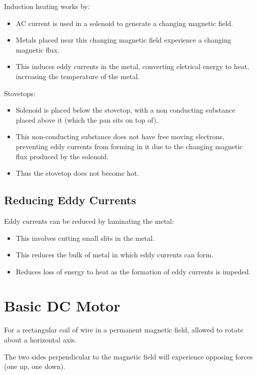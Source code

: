 \documentclass[a4paper,11pt]{report}
\begin{document}
Induction heating works by:

\begin{itemize}
\item AC current is used in a solenoid to generate a changing magnetic field.
\item Metals placed near this changing magnetic field experience a changing
	magnetic flux.
\item This induces eddy currents in the metal, converting eletrical energy to
	heat, increasing the temperature of the metal.
\end{itemize}

Stovetops:

\begin{itemize}
\item Solenoid is placed below the stovetop, with a non conducting substance
	placed above it (which the pan sits on top of).
\item This non-conducting substance does not have free moving electrons,
	preventing eddy currents from forming in it due to the changing magnetic
	flux produced by the solenoid.
\item Thus the stovetop does not become hot.
\end{itemize}

\subsection{Reducing Eddy Currents}

Eddy currents can be reduced by laminating the metal:

\begin{itemize}
\item This involves cutting small slits in the metal.
\item This reduces the bulk of metal in which eddy currents can form.
\item Reduces loss of energy to heat as the formation of eddy currents is
	impeded.
\end{itemize}


\section{Basic DC Motor}

For a rectangular coil of wire in a permanent magnetic field, allowed to rotate
about a horizontal axis.

The two sides perpendicular to the magnetic field will experience opposing
forces (one up, one down).
\end{document}
